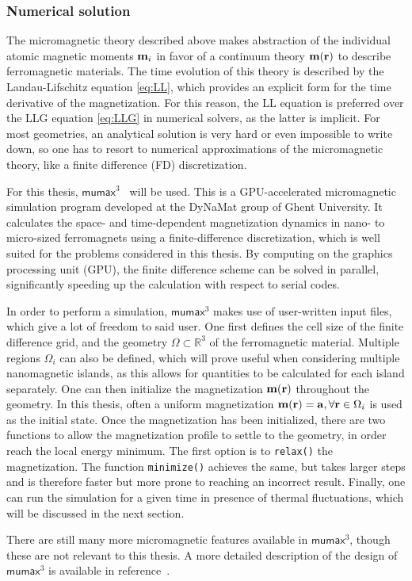 \documentclass[11pt,a4paper,english]{article}
\newcommand{\code}[1]{\texttt{#1}}
\newcommand{\mumax}{$\mathsf{mumax}^3$}
\begin{document}
\subsubsection{Numerical solution}
The micromagnetic theory described above makes abstraction of the individual atomic magnetic moments $\vb{m}_i$ in favor of a continuum theory $\vb{m}(\vb{r})$ to describe ferromagnetic materials. The time evolution of this theory is described by the Landau-Lifschitz equation \eqref{eq:LL}, which provides an explicit form for the time derivative of the magnetization. For this reason, the LL equation is preferred over the LLG equation \eqref{eq:LLG} in numerical solvers, as the latter is implicit. For most geometries, an analytical solution is very hard or even impossible to write down, so one has to resort to numerical approximations of the micromagnetic theory, like a finite difference (FD) discretization. \par
For this thesis, \mumax{}~\cite{MuMax3} will be used. This is a GPU-accelerated micromagnetic simulation program developed at the DyNaMat group of Ghent University. It calculates the space- and time-dependent magnetization dynamics in nano- to micro-sized ferromagnets using a finite-difference discretization, which is well suited for the problems considered in this thesis. By computing on the graphics processing unit (GPU), the finite difference scheme can be solved in parallel, significantly speeding up the calculation with respect to serial codes.~\cite{MicromagneticGPU} \par
In order to perform a simulation, \mumax{} makes use of user-written input files, which give a lot of freedom to said user. One first defines the cell size of the finite difference grid, and the geometry $\Omega \subset \mathbb{R}^3$ of the ferromagnetic material. Multiple regions $\Omega_i$ can also be defined, which will prove useful when considering multiple nanomagnetic islands, as this allows for quantities to be calculated for each island separately. One can then initialize the magnetization $\vb{m}(\vb{r})$ throughout the geometry. In this thesis, often a uniform magnetization $\vb{m}(\vb{r}) = \vb{a}, \forall \vb{r} \in \Omega_i$ is used as the initial state. Once the magnetization has been initialized, there are two functions to allow the magnetization profile to settle to the geometry, in order reach the local energy minimum. The first option is to \code{relax()} the magnetization. The function \code{minimize()} achieves the same, but takes larger steps and is therefore faster but more prone to reaching an incorrect result. Finally, one can run the simulation for a given time in presence of thermal fluctuations, which will be discussed in the next section. \par
There are still many more micromagnetic features available in \mumax{}, though these are not relevant to this thesis. A more detailed description of the design of \mumax{} is available in reference~\cite{MuMax3}.
\end{document}
